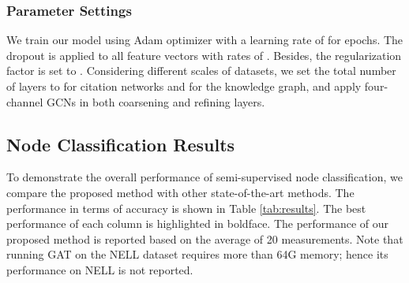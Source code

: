 \documentclass{article}
\begin{document}
\subsubsection{Parameter Settings}

We train our model using Adam optimizer with a learning rate of  for  epochs. The dropout is applied to all feature vectors with rates of . Besides, the  regularization factor is set to . Considering different scales of datasets, we set the total number of layers  to  for citation networks and  for the knowledge graph, and apply four-channel GCNs in both coarsening and refining layers.

\subsection{Node Classification Results}

To demonstrate the overall performance of semi-supervised node classification, we compare the proposed method with other state-of-the-art methods. The performance in terms of accuracy is shown in Table \ref{tab:results}. The best performance of each column is highlighted in boldface. The performance of our proposed method is reported based on the average of 20 measurements. Note that running GAT on the NELL dataset requires more than 64G memory; hence its performance on NELL is not reported.

\begin{table}
	\centering
	\caption{Results of node classification in terms of accuracy}
	\label{tab:results}
\end{table}
\end{document}
